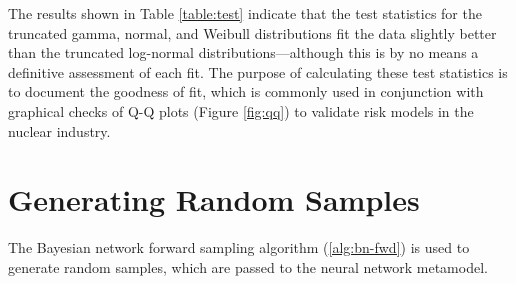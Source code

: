 The results shown in Table \ref{table:test} indicate that the test statistics for the truncated gamma, normal, and Weibull distributions fit the data slightly better than the truncated log-normal distributions---although this is by no means a definitive assessment of each fit.
The purpose of calculating these test statistics is to document the goodness of fit, which is commonly used in conjunction with graphical checks of Q-Q plots (Figure \ref{fig:qq}) to validate risk models in the nuclear industry.

\section{Generating Random Samples}

The Bayesian network forward sampling algorithm (\ref{alg:bn-fwd}) is used to generate random samples, which are passed to the neural network metamodel.

